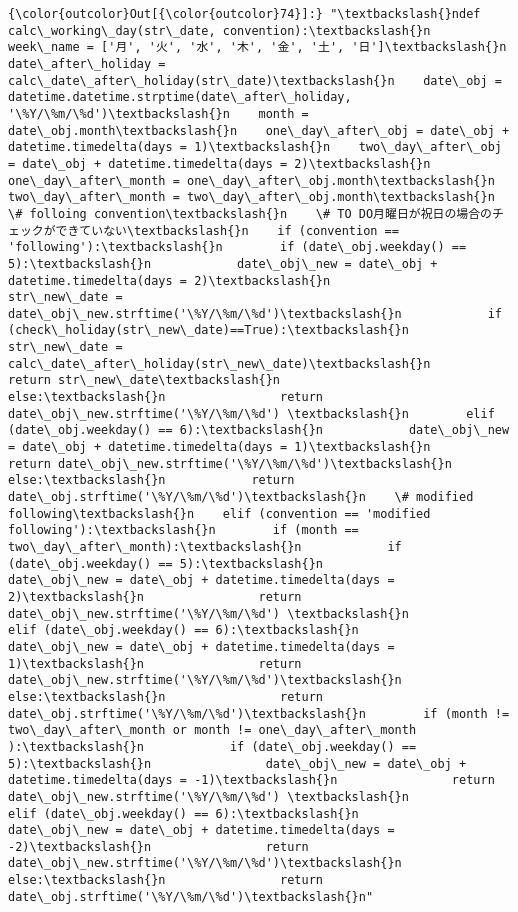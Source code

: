 \documentclass[11pt]{article}
\begin{document}
\begin{Verbatim}[commandchars=\\\{\}]
{\color{outcolor}Out[{\color{outcolor}74}]:} "\textbackslash{}ndef calc\_working\_day(str\_date, convention):\textbackslash{}n    week\_name = ['月', '火', '水', '木', '金', '土', '日']\textbackslash{}n    date\_after\_holiday = calc\_date\_after\_holiday(str\_date)\textbackslash{}n    date\_obj = datetime.datetime.strptime(date\_after\_holiday, '\%Y/\%m/\%d')\textbackslash{}n    month = date\_obj.month\textbackslash{}n    one\_day\_after\_obj = date\_obj + datetime.timedelta(days = 1)\textbackslash{}n    two\_day\_after\_obj = date\_obj + datetime.timedelta(days = 2)\textbackslash{}n    one\_day\_after\_month = one\_day\_after\_obj.month\textbackslash{}n    two\_day\_after\_month = two\_day\_after\_obj.month\textbackslash{}n    \# folloing convention\textbackslash{}n    \# TO DO月曜日が祝日の場合のチェックができていない\textbackslash{}n    if (convention == 'following'):\textbackslash{}n        if (date\_obj.weekday() == 5):\textbackslash{}n            date\_obj\_new = date\_obj + datetime.timedelta(days = 2)\textbackslash{}n            str\_new\_date = date\_obj\_new.strftime('\%Y/\%m/\%d')\textbackslash{}n            if (check\_holiday(str\_new\_date)==True):\textbackslash{}n                str\_new\_date = calc\_date\_after\_holiday(str\_new\_date)\textbackslash{}n                return str\_new\_date\textbackslash{}n            else:\textbackslash{}n                return date\_obj\_new.strftime('\%Y/\%m/\%d') \textbackslash{}n        elif (date\_obj.weekday() == 6):\textbackslash{}n            date\_obj\_new = date\_obj + datetime.timedelta(days = 1)\textbackslash{}n            return date\_obj\_new.strftime('\%Y/\%m/\%d')\textbackslash{}n        else:\textbackslash{}n            return date\_obj.strftime('\%Y/\%m/\%d')\textbackslash{}n    \# modified following\textbackslash{}n    elif (convention == 'modified following'):\textbackslash{}n        if (month == two\_day\_after\_month):\textbackslash{}n            if (date\_obj.weekday() == 5):\textbackslash{}n                date\_obj\_new = date\_obj + datetime.timedelta(days = 2)\textbackslash{}n                return date\_obj\_new.strftime('\%Y/\%m/\%d') \textbackslash{}n            elif (date\_obj.weekday() == 6):\textbackslash{}n                date\_obj\_new = date\_obj + datetime.timedelta(days = 1)\textbackslash{}n                return date\_obj\_new.strftime('\%Y/\%m/\%d')\textbackslash{}n            else:\textbackslash{}n                return date\_obj.strftime('\%Y/\%m/\%d')\textbackslash{}n        if (month != two\_day\_after\_month or month != one\_day\_after\_month ):\textbackslash{}n            if (date\_obj.weekday() == 5):\textbackslash{}n                date\_obj\_new = date\_obj + datetime.timedelta(days = -1)\textbackslash{}n                return date\_obj\_new.strftime('\%Y/\%m/\%d') \textbackslash{}n            elif (date\_obj.weekday() == 6):\textbackslash{}n                date\_obj\_new = date\_obj + datetime.timedelta(days = -2)\textbackslash{}n                return date\_obj\_new.strftime('\%Y/\%m/\%d')\textbackslash{}n            else:\textbackslash{}n                return date\_obj.strftime('\%Y/\%m/\%d')\textbackslash{}n"
\end{Verbatim}
            

    
    
    
    
\end{document}
